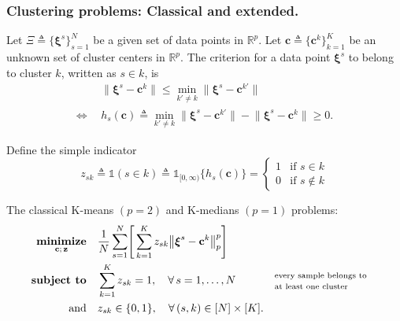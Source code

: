 \documentclass[aspectratio=169,xcolor=dvipsnames]{beamer}
\begin{document}
\begin{frame}
  \frametitle{Clustering problems:
    {\normalsize\mdseries Classical and extended.}}

  \footnotesize
  \setlength{\abovedisplayskip}{3pt}
  \setlength{\belowdisplayskip}{3pt}
  \setlength{\abovedisplayshortskip}{2pt}
  \setlength{\belowdisplayshortskip}{2pt}

  Let $\Xi\triangleq\{\boldsymbol{\xi}^s\}_{s=1}^{N}$ be a given set of data
  points in $\mathbb{R}^p$. Let
  $\mathbf{c}\triangleq\{\mathbf{c}^k\}_{k=1}^{K}$ be an unknown set of
  cluster centers in $\mathbb{R}^p$. The criterion for a data point
  $\boldsymbol{\xi}^s$ to belong to cluster $k$, written as $s\in k$, is
  \[
    \begin{aligned}
      &\bigl\|\boldsymbol{\xi}^s-\mathbf{c}^k\bigr\|\leq
        \min_{k'\neq k}\bigl\|\boldsymbol{\xi}^s-\mathbf{c}^{k'}\bigr\|\\
      \Leftrightarrow\ \ &h_s(\mathbf{c})\triangleq
        \min_{k'\neq k}\bigl\|\boldsymbol{\xi}^s-\mathbf{c}^{k'}\bigr\|
        -\bigl\|\boldsymbol{\xi}^s-\mathbf{c}^k\bigr\|\geq 0.
    \end{aligned}
  \]

  Define the simple indicator
  \[
    z_{sk}\triangleq\mathds{1}(s\in k)\triangleq
    \mathds{1}_{[0,\infty)}\bigl\{h_s(\mathbf{c})\bigr\}
    =\begin{cases}
      1 & \text{if }s\in k\\
      0 & \text{if }s\notin k
    \end{cases}
  \]

  \vspace{0.06cm}
  {\color{MediumBlue}The classical K-means $(p=2)$ and K-medians $(p=1)$
  problems:}
  \[
    \begin{aligned}
      \operatorname*{\textbf{minimize}}_{\mathbf{c};\,\mathbf{z}}\quad
      &\frac{1}{N}\sum_{s=1}^{N}\Biggl[\,\sum_{k=1}^{K}z_{sk}
        \bigl\|\boldsymbol{\xi}^s-\mathbf{c}^k\bigr\|_p^p\Biggr]\\
      \operatorname*{\textbf{subject to}}\quad
      &\sum_{k=1}^{K}z_{sk}=1,\quad\forall\,s=1,\ldots,N
        &&\begin{array}{@{}l@{}}
            \text{\scriptsize every sample belongs to}\\[-2pt]
            \text{\scriptsize at least one cluster}
          \end{array}\\
      \text{and}\quad
      &z_{sk}\in\{0,1\},\quad\forall\,(s,k)\in[N]\times[K].
    \end{aligned}
  \]
\end{frame}
\end{document}

